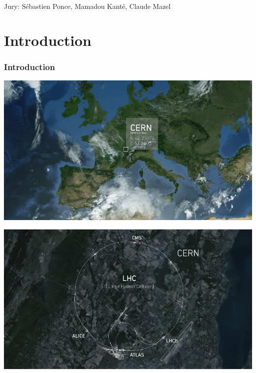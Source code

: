 \documentclass{beamer}
\begin{document}
\begin{frame}
    \maketitle

    Jury: Sébastien Ponce, Mamadou Kanté, Claude Mazel
\end{frame}


\part{Introduction}
\section*{Introduction}

\begin{frame}
    \includegraphics[width=\textwidth]{video/Geneva.png}
\end{frame}

\begin{frame}
    \includegraphics[width=\textwidth]{video/map.png}
\end{frame}
\end{document}
